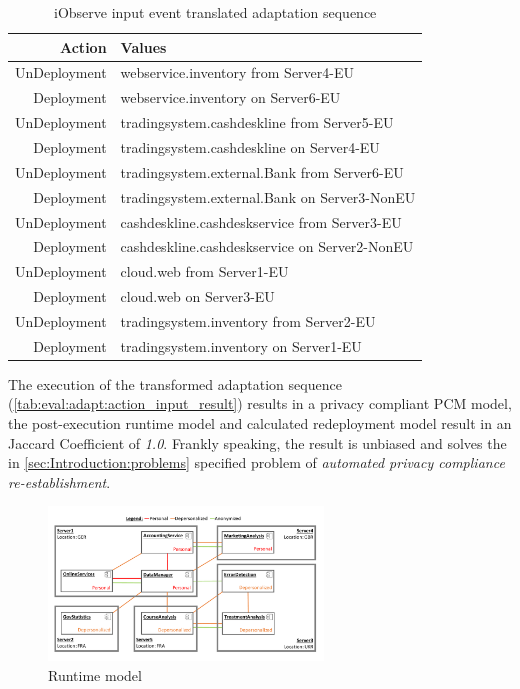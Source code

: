 \begin{table}[h]
	\centering
	\begin{tabular}{r | l}
		\hline
		\textbf{Action} & \textbf{Values}\\
		\hline
		UnDeployment & webservice.inventory from Server4-EU\\
		Deployment & webservice.inventory on Server6-EU\\
		
		UnDeployment & tradingsystem.cashdeskline from Server5-EU\\
		Deployment & tradingsystem.cashdeskline on Server4-EU\\
		
		UnDeployment & tradingsystem.external.Bank from Server6-EU\\
		Deployment & tradingsystem.external.Bank on Server3-NonEU\\
		
		UnDeployment & cashdeskline.cashdeskservice from Server3-EU\\
		Deployment & cashdeskline.cashdeskservice on Server2-NonEU\\
		
		UnDeployment & cloud.web from Server1-EU\\
		Deployment & cloud.web on Server3-EU\\
		
		UnDeployment & tradingsystem.inventory from Server2-EU\\
		Deployment & tradingsystem.inventory on Server1-EU\\
		\hline
	\end{tabular}
	\caption{iObserve input event translated adaptation sequence}
	\label{tab:eval:adapt:action_input_result}
\end{table}


The execution of the transformed adaptation sequence (\autoref{tab:eval:adapt:action_input_result}) results in a privacy compliant PCM model, the post-execution runtime model and calculated redeployment model result in an Jaccard Coefficient of \textit{1.0}. Frankly speaking, the result is unbiased and solves the in \autoref{sec:Introduction:problems} specified problem of \textit{automated privacy compliance re-establishment}.

\begin{figure}[h]
	\centering
	\includegraphics[trim = 5mm 10mm 10mm 10mm, clip, width=0.65\textwidth]{graphs/medSystem_adap_calc_all_runtime}
	\caption{Runtime model}
	\label{fig:eval:adapt:4:run}
\end{figure}


